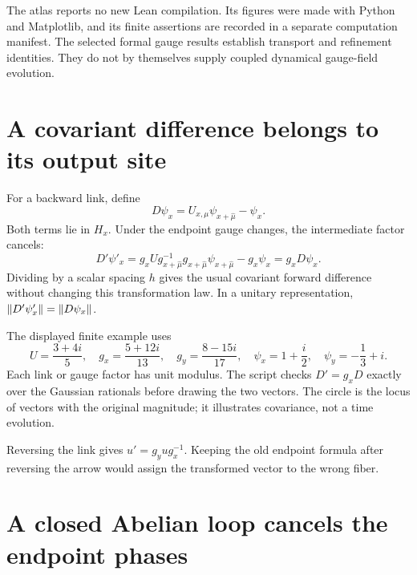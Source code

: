 The atlas reports no new Lean compilation. Its figures were made with Python and Matplotlib, and its finite assertions are recorded in a separate computation manifest. The selected formal gauge results establish transport and refinement identities. They do not by themselves supply coupled dynamical gauge-field evolution.

\clearpage
\section{A covariant difference belongs to its output site}

For a backward link, define
\[
D\psi_x=U_{x,\mu}\psi_{x+\widehat\mu}-\psi_x.
\]
Both terms lie in $H_x$. Under the endpoint gauge changes, the intermediate factor cancels:
\[
D'\psi'_x
=g_xUg_{x+\widehat\mu}^{-1}g_{x+\widehat\mu}\psi_{x+\widehat\mu}
-g_x\psi_x
=g_xD\psi_x.
\]
Dividing by a scalar spacing $h$ gives the usual covariant forward difference without changing this transformation law. In a unitary representation, $\left\lVert D'\psi'_x\right\rVert=\left\lVert D\psi_x\right\rVert$.

The displayed finite example uses
\[
U=\frac{3+4i}{5},\quad g_x=\frac{5+12i}{13},\quad
g_y=\frac{8-15i}{17},\quad
\psi_x=1+\frac i2,\quad\psi_y=-\frac13+i.
\]
Each link or gauge factor has unit modulus. The script checks $D'=g_xD$ exactly over the Gaussian rationals before drawing the two vectors. The circle is the locus of vectors with the original magnitude; it illustrates covariance, not a time evolution.

Reversing the link gives $u'=g_yug_x^{-1}$. Keeping the old endpoint formula after reversing the arrow would assign the transformed vector to the wrong fiber.



\clearpage
\section{A closed Abelian loop cancels the endpoint phases}


